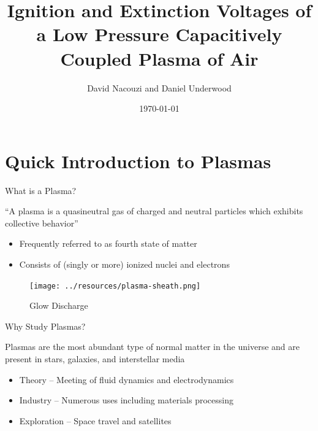 \documentclass{beamer}
\title{Ignition and Extinction Voltages of a Low Pressure Capacitively Coupled Plasma of Air}
\date{\today}
\author{David Nacouzi and Daniel Underwood}
\institute{North Carolina State University}
\begin{document}
  \maketitle
  
  \section{Quick Introduction to Plasmas}
  
  \begin{frame}{What is a Plasma?}

	``A plasma is a quasineutral gas of charged and neutral particles which exhibits
	collective behavior'' 
    
    \begin{itemize}
    	\item Frequently referred to as fourth state of matter
        \item Consists of (singly or more) ionized nuclei and electrons
    \end{itemize}
    
    \begin{figure}
        \begin{center}
        \texttt{[image: ../resources/plasma-sheath.png]}
        \hspace{15pt}
        \caption{Glow Discharge}
        \label{fig: plasma-chamber}
        \end{center}
     \end{figure}
    
    
  \end{frame}
  
  \begin{frame}{Why Study Plasmas?}
  
    Plasmas are the most abundant type of normal matter in the universe and are present
    in stars, galaxies, and interstellar media
    
    \begin{itemize}
      \item Theory -- Meeting of fluid dynamics and electrodynamics
      \item Industry -- Numerous uses including materials processing
      \item Exploration -- Space travel and satellites
    \end{itemize}

  \end{frame}
  
\end{document}
